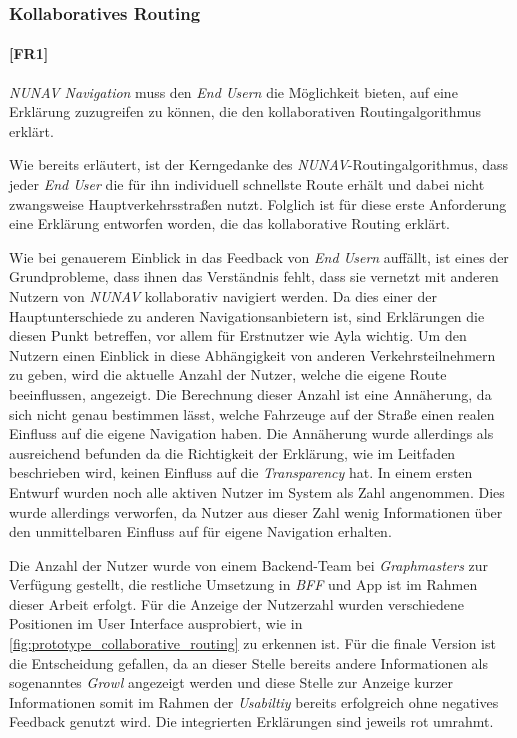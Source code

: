 \subsubsection{Kollaboratives Routing}

\paragraph{[FR1]} \textit{NUNAV Navigation} muss den \textit{End Usern} die Möglichkeit bieten, auf eine Erklärung zuzugreifen zu können, die den kollaborativen Routingalgorithmus erklärt.

\bigskip

Wie bereits erläutert, ist der Kerngedanke des \textit{NUNAV}-Routingalgorithmus, dass jeder \textit{End User} die für ihn individuell schnellste Route erhält und dabei nicht zwangsweise Hauptverkehrsstraßen nutzt. Folglich ist für diese erste Anforderung eine Erklärung entworfen worden, die das kollaborative Routing erklärt.

Wie bei genauerem Einblick in das Feedback von \textit{End Usern} auffällt, ist eines der Grundprobleme, dass ihnen das Verständnis fehlt, dass sie vernetzt mit anderen Nutzern von \textit{NUNAV} kollaborativ navigiert werden. Da dies einer der Hauptunterschiede zu anderen Navigationsanbietern ist, sind Erklärungen die diesen Punkt betreffen, vor allem für Erstnutzer wie Ayla wichtig. Um den Nutzern einen Einblick in diese Abhängigkeit von anderen Verkehrsteilnehmern zu geben, wird die aktuelle Anzahl der Nutzer, welche die eigene Route beeinflussen, angezeigt. Die Berechnung dieser Anzahl ist eine Annäherung, da sich nicht genau bestimmen lässt, welche Fahrzeuge auf der Straße einen realen Einfluss auf die eigene Navigation haben. Die Annäherung wurde allerdings als ausreichend befunden da die Richtigkeit der Erklärung, wie im Leitfaden beschrieben wird, keinen Einfluss auf die \textit{Transparency} hat. In einem ersten Entwurf wurden noch alle aktiven Nutzer im System als Zahl angenommen. Dies wurde allerdings verworfen, da Nutzer aus dieser Zahl wenig Informationen über den unmittelbaren Einfluss auf für eigene Navigation erhalten.

Die Anzahl der Nutzer wurde von einem Backend-Team bei \textit{Graphmasters} zur Verfügung gestellt, die restliche Umsetzung in \textit{BFF} und App ist im Rahmen dieser Arbeit erfolgt. Für die Anzeige der Nutzerzahl wurden verschiedene Positionen im User Interface ausprobiert, wie in \autoref{fig:prototype_collaborative_routing} zu erkennen ist. Für die finale Version ist die Entscheidung gefallen, da an dieser Stelle bereits andere Informationen als sogenanntes \textit{Growl} angezeigt werden und diese Stelle zur Anzeige kurzer Informationen somit im Rahmen der \textit{Usabiltiy} bereits erfolgreich ohne negatives Feedback genutzt wird. Die integrierten Erklärungen sind jeweils rot umrahmt.

